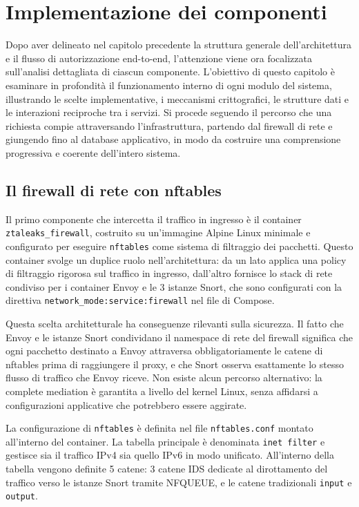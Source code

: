 \chapter{Implementazione dei componenti}

Dopo aver delineato nel capitolo precedente la struttura generale dell'architettura e il flusso di autorizzazione end-to-end, l'attenzione viene ora focalizzata sull'analisi dettagliata di ciascun componente. L'obiettivo di questo capitolo è esaminare in profondità il funzionamento interno di ogni modulo del sistema, illustrando le scelte implementative, i meccanismi crittografici, le strutture dati e le interazioni reciproche tra i servizi. Si procede seguendo il percorso che una richiesta compie attraversando l'infrastruttura, partendo dal firewall di rete e giungendo fino al database applicativo, in modo da costruire una comprensione progressiva e coerente dell'intero sistema.

\section{Il firewall di rete con nftables}

Il primo componente che intercetta il traffico in ingresso è il container \texttt{ztaleaks\_firewall}, costruito su un'immagine Alpine Linux minimale e configurato per eseguire \texttt{nftables} come sistema di filtraggio dei pacchetti. Questo container svolge un duplice ruolo nell'architettura: da un lato applica una policy di filtraggio rigorosa sul traffico in ingresso, dall'altro fornisce lo stack di rete condiviso per i container Envoy e le 3 istanze Snort, che sono configurati con la direttiva \texttt{network\_mode:service:firewall} nel file di Compose.

Questa scelta architetturale ha conseguenze rilevanti sulla sicurezza. Il fatto che Envoy e le istanze Snort condividano il namespace di rete del firewall significa che ogni pacchetto destinato a Envoy attraversa obbligatoriamente le catene di nftables prima di raggiungere il proxy, e che Snort osserva esattamente lo stesso flusso di traffico che Envoy riceve. Non esiste alcun percorso alternativo: la complete mediation è garantita a livello del kernel Linux, senza affidarsi a configurazioni applicative che potrebbero essere aggirate.

La configurazione di \texttt{nftables} è definita nel file \texttt{nftables.conf} montato all'interno del container. La tabella principale è denominata \texttt{inet filter} e gestisce sia il traffico IPv4 sia quello IPv6 in modo unificato. All'interno della tabella vengono definite 5 catene: 3 catene IDS dedicate al dirottamento del traffico verso le istanze Snort tramite NFQUEUE, e le catene tradizionali \texttt{input} e \texttt{output}.

